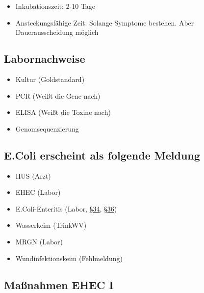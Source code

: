 \documentclass[
]{article}
\providecommand{\tightlist}{%
  \setlength{\itemsep}{0pt}\setlength{\parskip}{0pt}}
\begin{document}
\begin{itemize}
\tightlist
\item
  Inkubationszeit: 2-10 Tage
\item
  Ansteckungsfähige Zeit: Solange Symptome bestehen. Aber
  Dauerausscheidung möglich
\end{itemize}

\hypertarget{labornachweise}{%
\subsection{Labornachweise}\label{labornachweise}}

\begin{itemize}
\tightlist
\item
  Kultur (Goldstandard)
\item
  PCR (Weißt die Gene nach)
\item
  ELISA (Weißt die Toxine nach)
\item
  Genomsequenzierung
\end{itemize}

\hypertarget{e.coli-erscheint-als-folgende-meldung}{%
\subsection{E.Coli erscheint als folgende
Meldung}\label{e.coli-erscheint-als-folgende-meldung}}

\begin{itemize}
\tightlist
\item
  HUS (Arzt)
\item
  EHEC (Labor)
\item
  E.Coli-Enteritis (Labor,
  \href{https://www.gesetze-im-internet.de/ifsg/__34.html}{§34},
  \href{https://www.gesetze-im-internet.de/ifsg/__36.html}{§36})
\item
  Wasserkeim (TrinkWV)
\item
  MRGN (Labor)
\item
  Wundinfektionskeim (Fehlmeldung)
\end{itemize}

\hypertarget{mauxdfnahmen-ehec-i}{%
\subsection{Maßnahmen EHEC I}\label{mauxdfnahmen-ehec-i}}
\end{document}
